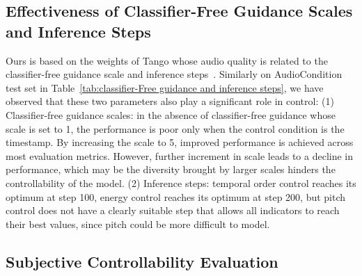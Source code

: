\documentclass[letterpaper]{article} %
\begin{document}
\subsection{Effectiveness of Classifier-Free Guidance Scales and Inference Steps}

Ours is based on the weights of Tango whose audio quality is related to the classifier-free guidance scale and inference steps~\cite{ghosal2023tango}. Similarly on AudioCondition test set in Table~\ref{tab:classifier-Free guidance and inference steps}, we have observed that these two parameters also play a significant role in control: (1) Classifier-free guidance scales: in the absence of classifier-free guidance whose scale is set to 1, the performance is poor only when the control condition is the timestamp. By increasing the scale to 5, improved performance is achieved across most evaluation metrics. However, further increment in scale leads to a decline in performance, which may be the diversity brought by larger scales hinders the controllability of the model. (2) Inference steps: temporal order control reaches its optimum at step 100, energy control reaches its optimum at step 200, but pitch control does not have a clearly suitable step that allows all indicators to reach their best values, since pitch could be more difficult to model.

\subsection{Subjective Controllability Evaluation}
\end{document}
